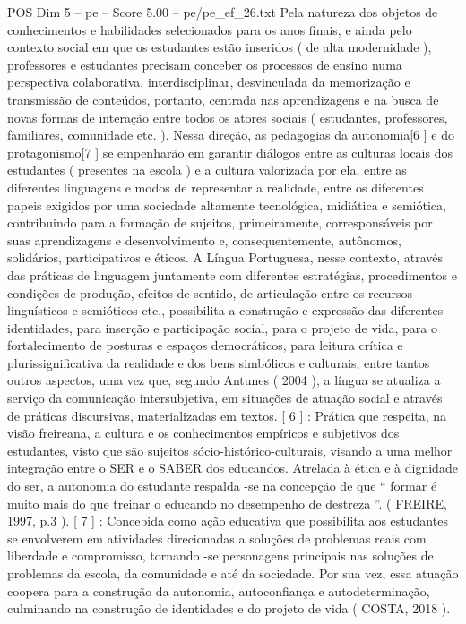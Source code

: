 \begin{textsample}{POS Dim 5 – pe – Score 5.00 – pe/pe\_ef\_26.txt}
Pela natureza dos objetos de conhecimentos e habilidades selecionados para os anos finais, e ainda pelo contexto social em que os estudantes estão inseridos ( de alta modernidade ), professores e estudantes precisam conceber os processos de ensino numa perspectiva colaborativa, interdisciplinar, desvinculada da memorização e transmissão de conteúdos, portanto, centrada nas aprendizagens e na busca de novas formas de interação entre todos os atores sociais ( estudantes, professores, familiares, comunidade etc. ).
Nessa direção, as pedagogias da autonomia[6 ] e do protagonismo[7 ] se empenharão em garantir diálogos entre as culturas locais dos estudantes ( presentes na escola ) e a cultura valorizada por ela, entre as diferentes linguagens e modos de representar a realidade, entre os diferentes papeis exigidos por uma sociedade altamente tecnológica, midiática e semiótica, contribuindo para a formação de sujeitos, primeiramente, corresponsáveis por suas aprendizagens e desenvolvimento e, consequentemente, autônomos, solidários, participativos e éticos.
A Língua Portuguesa, nesse contexto, através das práticas de linguagem juntamente com diferentes estratégias, procedimentos e condições de produção, efeitos de sentido, de articulação entre os recursos linguísticos e semióticos etc., possibilita a construção e expressão das diferentes identidades, para inserção e participação social, para o projeto de vida, para o fortalecimento de posturas e espaços democráticos, para leitura crítica e plurissignificativa da realidade e dos bens simbólicos e culturais, entre tantos outros aspectos, uma vez que, segundo Antunes ( 2004 ), a língua se atualiza a serviço da comunicação intersubjetiva, em situações de atuação social e através de práticas discursivas, materializadas em textos. [ 6 ] : Prática que respeita, na visão freireana, a cultura e os conhecimentos empíricos e subjetivos dos estudantes, visto que são sujeitos sócio-histórico-culturais, visando a uma melhor integração entre o SER e o SABER dos educandos.
Atrelada à ética e à dignidade do ser, a autonomia do estudante respalda -se na concepção de que “ formar é muito mais do que treinar o educando no desempenho de destreza ”. ( FREIRE, 1997, p.3 ). [ 7 ] : Concebida como ação educativa que possibilita aos estudantes se envolverem em atividades direcionadas a soluções de problemas reais com liberdade e compromisso, tornando -se personagens principais nas soluções de problemas da escola, da comunidade e até da sociedade.
Por sua vez, essa atuação coopera para a construção da autonomia, autoconfiança e autodeterminação, culminando na construção de identidades e do projeto de vida ( COSTA, 2018 ).

\end{textsample}
